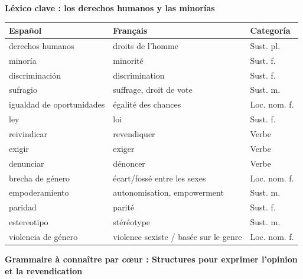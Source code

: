 \documentclass[11pt]{article}
\newcommand{\cle}[1]{{\popxbold\color{popdark}#1}}
\begin{document}
\begin{bilan}

\textbf{Léxico clave : los derechos humanos y las minorías}

\begin{center}
\begin{tabularx}{\linewidth}{|X|X|l|}
\hline
\rowcolor{popblueL}
\textbf{Español} & \textbf{Français} & \textbf{Categoría} \\
\hline
\cle{derechos humanos} & droits de l'homme & Sust. pl. \\
\cle{minoría} & minorité & Sust. f. \\
\cle{discriminación} & discrimination & Sust. f. \\
\cle{sufragio} & suffrage, droit de vote & Sust. m. \\
\cle{igualdad de oportunidades} & égalité des chances & Loc. nom. f. \\
\cle{ley} & loi & Sust. f. \\
\cle{reivindicar} & revendiquer & Verbe \\
\cle{exigir} & exiger & Verbe \\
\cle{denunciar} & dénoncer & Verbe \\
\cle{brecha de género} & écart/fossé entre les sexes & Loc. nom. f. \\
\cle{empoderamiento} & autonomisation, empowerment & Sust. m. \\
\cle{paridad} & parité & Sust. f. \\
\cle{estereotipo} & stéréotype & Sust. m. \\
\cle{violencia de género} & violence sexiste / basée sur le genre & Loc. nom. f. \\
\hline
\end{tabularx}
\end{center}

\textbf{Grammaire à connaître par cœur : Structures pour exprimer l'opinion et la revendication}


\end{bilan}
\end{document}
